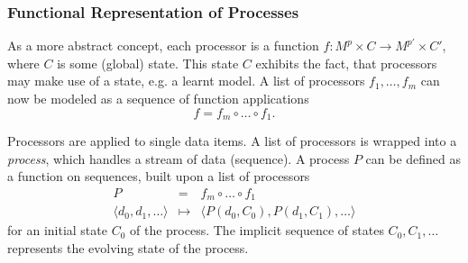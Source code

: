\subsubsection*{Functional Representation of Processes}

As a more abstract concept, each processor is a function $f: M^p\times
C \rightarrow M^{p'}\times C'$, where $C$ is some (global) state. This
state $C$ exhibits the fact, that processors may make use of a state,
e.g. a learnt model. A list of processors $f_1,\ldots,f_m$ can now be modeled as a
sequence of function applications
\begin{displaymath}
  f = f_m \circ \ldots\circ f_1.
\end{displaymath}

Processors are applied to single data items. A list of processors is
wrapped into a {\em process}, which handles a stream of data
(sequence). A process $P$ can be defined as a function on sequences,
built upon a list of processors
\begin{eqnarray*}
  P &=& f_m \circ\ldots\circ f_1 \\
  \langle d_0,d_1,\ldots \rangle &\mapsto& \langle P(d_0,C_0),P(d_1,C_1),\ldots \rangle
\end{eqnarray*}
for an initial state $C_0$ of the process. The implicit sequence of
states $C_0,C_1,\ldots$ represents the evolving state of the process.
